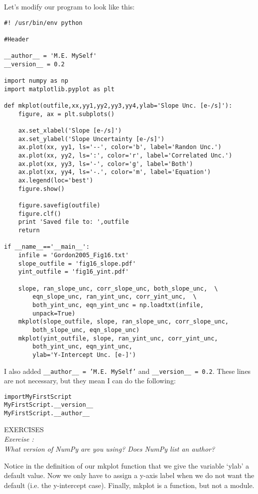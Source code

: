 Let's modify our program to look like this:

\begin{verbatim}
#! /usr/bin/env python

#Header

__author__ = 'M.E. MySelf'
__version__ = 0.2

import numpy as np
import matplotlib.pyplot as plt

def mkplot(outfile,xx,yy1,yy2,yy3,yy4,ylab='Slope Unc. [e-/s]'):
    figure, ax = plt.subplots()

    ax.set_xlabel('Slope [e-/s]')
    ax.set_ylabel('Slope Uncertainty [e-/s]')
    ax.plot(xx, yy1, ls='--', color='b', label='Randon Unc.')
    ax.plot(xx, yy2, ls=':', color='r', label='Correlated Unc.')
    ax.plot(xx, yy3, ls='-', color='g', label='Both')
    ax.plot(xx, yy4, ls='-.', color='m', label='Equation')
    ax.legend(loc='best')
    figure.show()

    figure.savefig(outfile) 
    figure.clf()
    print 'Saved file to: ',outfile 
    return  
    
if __name__=='__main__': 
    infile = 'Gordon2005_Fig16.txt' 
    slope_outfile = 'fig16_slope.pdf'  
    yint_outfile = 'fig16_yint.pdf'  
    
    slope, ran_slope_unc, corr_slope_unc, both_slope_unc,  \
        eqn_slope_unc, ran_yint_unc, corr_yint_unc,  \
        both_yint_unc, eqn_yint_unc = np.loadtxt(infile, 
        unpack=True) 
    mkplot(slope_outfile, slope, ran_slope_unc, corr_slope_unc,  
        both_slope_unc, eqn_slope_unc) 
    mkplot(yint_outfile, slope, ran_yint_unc, corr_yint_unc,  
        both_yint_unc, eqn_yint_unc,
        ylab='Y-Intercept Unc. [e-]')
\end{verbatim}

I also added \texttt{\_\_author\_\_ = 'M.E. MySelf'} and
\texttt{\_\_version\_\_ = 0.2}.  These lines are not necessary, but
they mean I can do the following:
\begin{alltt}
\pytab import MyFirstScript
\pytab MyFirstScript.__version__
\pytab MyFirstScript.__author__
\end{alltt}

{\color{blue} {\sf\small EXERCISES}} \\
{\it Exercise  :  \\
  What version of NumPy are you using?  Does NumPy list an author?
}

Notice in the definition of our mkplot function that we give the
variable `ylab' a default value.  Now we only have to assign a y-axis
label when we do not want the default (i.e. the y-intercept case).
Finally, {\sf \small mkplot} is a function, but not a module.

